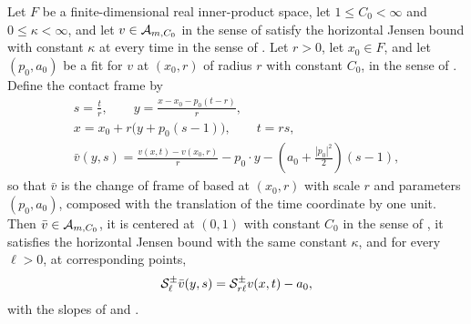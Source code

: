 \begin{lemma}
Let $F$ be a finite-dimensional real inner-product space, let
$1\le C_0<\infty$ and $0\le\kappa<\infty$, and let $v\in\mathcal{A}_{m,C_0}$ in the
sense of  satisfy the horizontal Jensen bound with constant
$\kappa$ at every time in the sense of . Let $r>0$, let
$x_0\in F$, and let $(p_0,a_0)$ be a fit for $v$ at $(x_0,r)$ of radius $r$ with
constant $C_0$, in the sense of . Define the contact frame by
\begin{equation}\label{eq:contact-frame}
\begin{gathered}
  s=\frac{t}{r},\qquad y=\frac{x-x_0-p_0(t-r)}{r},\\
  x=x_0+r\bigl(y+p_0(s-1)\bigr),\qquad t=rs,\\
  \bar v(y,s)=\frac{v(x,t)-v(x_0,r)}{r}
          -p_0\cdot y-\left(a_0+\frac{|p_0|^2}{2}\right)(s-1),
\end{gathered}
\end{equation}
so that $\bar v$ is the change of frame of  based at
$(x_0,r)$ with scale $r$ and parameters $(p_0,a_0)$, composed with the
translation of the time coordinate by one unit. Then $\bar v\in\mathcal{A}_{m,C_0}$,
it is centered at $(0,1)$ with constant $C_0$ in the sense of
, it satisfies the horizontal Jensen bound with the same
constant $\kappa$, and for every $\ell>0$, at corresponding points,
\begin{equation}\label{eq:fitted-slope-covariance}
  \mathcal{S}_\ell^\pm\bar v(y,s)=\mathcal{S}_{r\ell}^\pm v(x,t)-a_0,
\end{equation}
with the slopes of  and .
\end{lemma}
